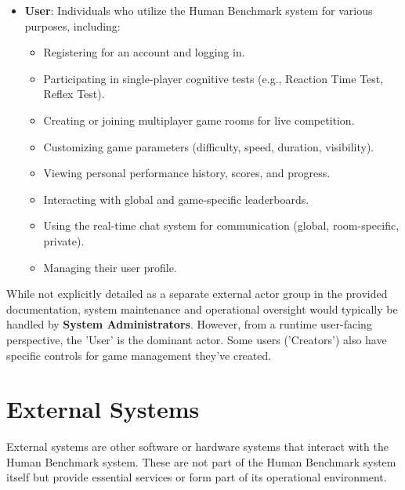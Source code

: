 \begin{itemize}
    \item \textbf{User}: Individuals who utilize the Human Benchmark system for various purposes, including:
    \begin{itemize}
        \item Registering for an account and logging in.
        \item Participating in single-player cognitive tests (e.g., Reaction Time Test, Reflex Test).
        \item Creating or joining multiplayer game rooms for live competition.
        \item Customizing game parameters (difficulty, speed, duration, visibility).
        \item Viewing personal performance history, scores, and progress.
        \item Interacting with global and game-specific leaderboards.
        \item Using the real-time chat system for communication (global, room-specific, private).
        \item Managing their user profile.
    \end{itemize}
\end{itemize}
While not explicitly detailed as a separate external actor group in the provided documentation, system maintenance and operational oversight would typically be handled by \textbf{System Administrators}. However, from a runtime user-facing perspective, the 'User' is the dominant actor. Some users ('Creators') also have specific controls for game management they've created.

\section{External Systems}
External systems are other software or hardware systems that interact with the Human Benchmark system. These are not part of the Human Benchmark system itself but provide essential services or form part of its operational environment.

